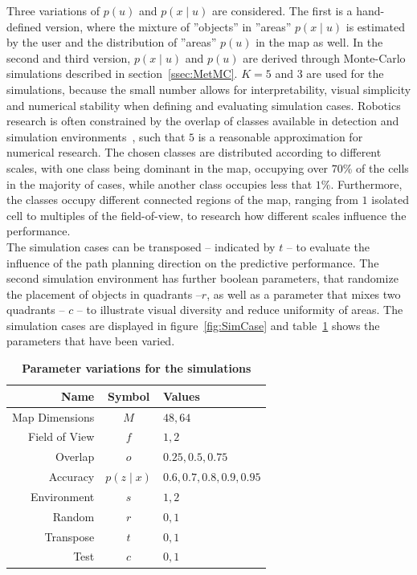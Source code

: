 \documentclass[twocolumn,letterpaper]{IEEEAerospaceCLS}  %
\begin{document}
Three variations of $p(u)$ and $p(x\mid u)$ are considered. The first is a hand-defined version, where the mixture of ''objects'' in ''areas'' $p(x\mid u)$ is estimated by the user and the distribution of ''areas'' $p(u)$ in the map as well. In the second and third version, $p(x\mid u)$ and $p(u)$ are derived through Monte-Carlo simulations described in section~\ref{ssec:MetMC}. $K=5$ and $3$ are used for the simulations, because the small number allows for interpretability, visual simplicity and numerical stability when defining and evaluating simulation cases. Robotics research is often constrained by the overlap of classes available in detection and simulation environments~\cite{chaplot_object_2020}, such that $5$ is a reasonable approximation for numerical research. The chosen classes are distributed according to different scales, with one class being dominant in the map, occupying over $70$\% of the cells in the majority of cases, while another class occupies less that $1$\%. Furthermore, the classes occupy different connected regions of the map, ranging from $1$ isolated cell to multiples of the field-of-view, to research how different scales influence the performance.\\
The simulation cases can be transposed -- indicated by $t$ -- to evaluate the influence of the path planning direction on the predictive performance. The second simulation environment has further boolean parameters, that randomize the placement of objects in quadrants --$r$, as well as a parameter that mixes two quadrants -- $c$ -- to illustrate visual diversity and reduce uniformity of areas. The simulation cases are displayed in figure~\ref{fig:SimCase} and table~\ref{tab:params} shows the parameters that have been varied.
\begin{table}[]
    \renewcommand{\arraystretch}{1.3}
    \caption{\bf Parameter variations for the simulations}
    \label{tab:params}
    \centering
    \begin{tabular}{|r||c|l|}
        \hline
        \bfseries Name      & \bfseries Symbol & \bfseries Values       \\
        \hline \hline
        Map Dimensions & $M$ & $48, 64$\\
        \hline
        Field of View  & $f$              & $1, 2$ \\
        \hline
        Overlap     & $o$              & $0.25, 0.5, 0.75$         \\
        \hline
        Accuracy & $p(z\mid x)$              & $0.6, 0.7, 0.8, 0.9, 0.95$        \\
        \hline
        Environment & $s$& $1, 2$ \\
        \hline
        Random & $r$ & $0, 1$ \\
        \hline
        Transpose & $t$ & $0, 1$  \\
        \hline
        Test & $c$ & $0, 1$  \\
        \hline
    \end{tabular}
\end{table}
\end{document}
